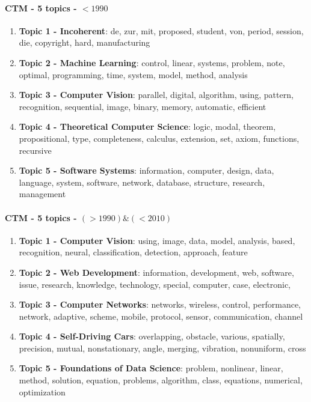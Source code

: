 \documentclass[fleqn,10pt]{SelfArx} %
\begin{document}
\vspace{0.2cm}

\paragraph{CTM - 5 topics - $< 1990$}

\begin{enumerate}
    \item \textbf{Topic 1 - Incoherent}: de, zur, mit, proposed, student, von, period, session, die, copyright, hard, manufacturing
    \item \textbf{Topic 2 - Machine Learning}: control, linear, systems, problem, note, optimal, programming, time, system, model, method, analysis
    \item \textbf{Topic 3 - Computer Vision}: parallel, digital, algorithm, using, pattern, recognition, sequential, image, binary, memory, automatic, efficient
    \item \textbf{Topic 4 - Theoretical Computer Science}: logic, modal, theorem, propositional, type, completeness, calculus, extension, set, axiom, functions, recursive
    \item \textbf{Topic 5 - Software Systems}: information, computer, design, data, language, system, software, network, database, structure, research, management
\end{enumerate}

\vspace{0.2cm}

\paragraph{CTM - 5 topics - $(> 1990) \& (< 2010)$}
\begin{enumerate}
    \item \textbf{Topic 1 - Computer Vision}: using, image, data, model, analysis, based, recognition, neural, classification, detection, approach, feature
    \item \textbf{Topic 2 - Web Development}: information, development, web, software, issue, research, knowledge, technology, special, computer, case, electronic,
    \item \textbf{Topic 3 - Computer Networks}: networks, wireless, control, performance, network, adaptive, scheme, mobile, protocol, sensor, communication, channel
    \item \textbf{Topic 4 - Self-Driving Cars}: overlapping, obstacle, various, spatially, precision, mutual, nonstationary, angle, merging, vibration, nonuniform, cross
    \item \textbf{Topic 5 - Foundations of Data Science}: problem, nonlinear, linear, method, solution, equation, problems, algorithm, class, equations, numerical, optimization
\end{enumerate}
\end{document}
